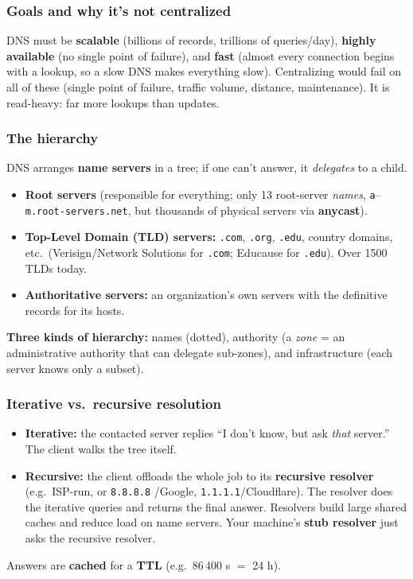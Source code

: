 \documentclass[hidelinks]{article}
\begin{document}
\subsubsection{Goals and why it's not centralized}
DNS must be \textbf{scalable} (billions of records, trillions of
queries/day), \textbf{highly available} (no single point of failure),
and \textbf{fast} (almost every connection begins with a lookup, so a slow
DNS makes everything slow). Centralizing would fail on all of these
(single point of failure, traffic volume, distance, maintenance). It is
read-heavy: far more lookups than updates.

\subsubsection{The hierarchy}
DNS arranges \textbf{name servers} in a tree; if one can't answer, it
\emph{delegates} to a child.
\begin{itemize}
    \item \textbf{Root servers} (responsible for everything; only 13
    root-server \emph{names}, \texttt{a}--\texttt{m.root-servers.net}, but
    thousands of physical servers via \textbf{anycast}).
    \item \textbf{Top-Level Domain (TLD) servers:} \texttt{.com},
    \texttt{.org}, \texttt{.edu}, country domains, etc.\ (Verisign/Network
    Solutions for \texttt{.com}; Educause for \texttt{.edu}). Over 1500 TLDs
    today.
    \item \textbf{Authoritative servers:} an organization's own servers with
    the definitive records for its hosts.
\end{itemize}

\textbf{Three kinds of hierarchy:} names (dotted), authority (a
\emph{zone} = an administrative authority that can delegate sub-zones), and
infrastructure (each server knows only a subset).

\subsubsection{Iterative vs.\ recursive resolution}
\begin{itemize}
    \item \textbf{Iterative:} the contacted server replies ``I don't know,
    but ask \emph{that} server.'' The client walks the tree itself.
    \item \textbf{Recursive:} the client offloads the whole job to its
    \textbf{recursive resolver} (e.g.\ ISP-run, or \texttt{8.8.8.8}
    /Google, \texttt{1.1.1.1}/Cloudflare). The resolver does the iterative
    queries and returns the final answer. Resolvers build large shared caches
    and reduce load on name servers. Your machine's \textbf{stub resolver}
    just asks the recursive resolver.
\end{itemize}
Answers are \textbf{cached} for a \textbf{TTL} (e.g.\ 86\,400 s $=$ 24 h).
\end{document}
